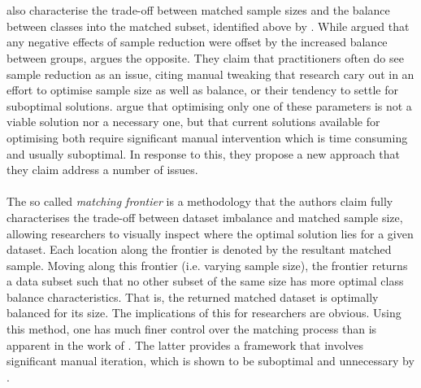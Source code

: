 {\\\\
\cite{king2014balance} also characterise the trade-off between matched sample sizes and the balance between classes into the matched subset, identified above by \cite{stuart2010matching}. While \cite{stuart2010matching} argued that any negative effects of sample reduction were offset by the increased balance between groups, \cite{king2014balance} argues the opposite. They claim that practitioners often do see sample reduction as an issue, citing manual tweaking that research cary out in an effort to optimise sample size as well as balance, or their tendency to settle for suboptimal solutions. \cite{king2014balance} argue that optimising only one of these parameters is not a viable solution nor a necessary one, but that current solutions available for optimising both require significant manual intervention which is time consuming and usually suboptimal. In response to this, they propose a new approach that they claim address a number of issues. \\\\
The so called {\it matching frontier} is a methodology that the authors claim fully characterises the trade-off between dataset imbalance and matched sample size, allowing researchers to visually inspect where the optimal solution lies for a given dataset. Each location along the frontier is denoted by the resultant matched sample. Moving along this frontier (i.e. varying sample size), the frontier returns a data subset such that no other subset of the same size has more optimal class balance characteristics. That is, the returned matched dataset is optimally balanced for its size. The implications of this for researchers are obvious. Using this method, one has much finer control over the matching process than is apparent in the work of  \cite{stuart2010matching}. The latter provides a framework that involves significant manual iteration, which is shown to be suboptimal and unnecessary by \cite{king2014balance}. }
